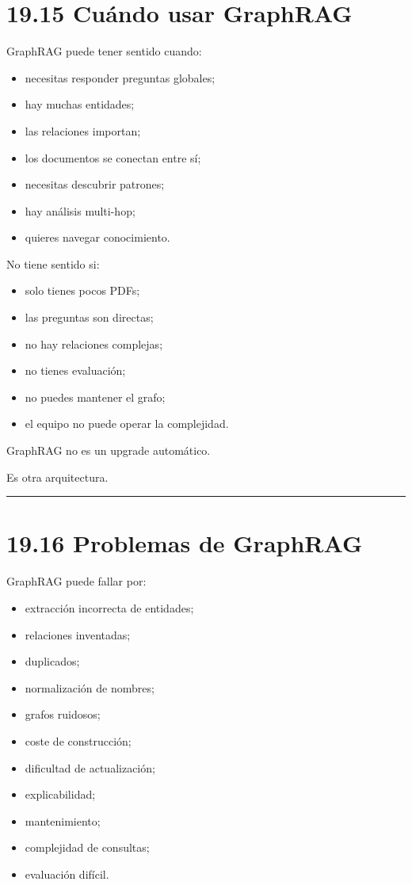 \section{19.15 Cuándo usar GraphRAG}\label{cuuxe1ndo-usar-graphrag}

GraphRAG puede tener sentido cuando:

\begin{itemize}
\tightlist
\item
  necesitas responder preguntas globales;
\item
  hay muchas entidades;
\item
  las relaciones importan;
\item
  los documentos se conectan entre sí;
\item
  necesitas descubrir patrones;
\item
  hay análisis multi-hop;
\item
  quieres navegar conocimiento.
\end{itemize}

No tiene sentido si:

\begin{itemize}
\tightlist
\item
  solo tienes pocos PDFs;
\item
  las preguntas son directas;
\item
  no hay relaciones complejas;
\item
  no tienes evaluación;
\item
  no puedes mantener el grafo;
\item
  el equipo no puede operar la complejidad.
\end{itemize}

GraphRAG no es un upgrade automático.

Es otra arquitectura.

\begin{center}\rule{0.5\linewidth}{0.5pt}\end{center}

\section{19.16 Problemas de GraphRAG}\label{problemas-de-graphrag}

GraphRAG puede fallar por:

\begin{itemize}
\tightlist
\item
  extracción incorrecta de entidades;
\item
  relaciones inventadas;
\item
  duplicados;
\item
  normalización de nombres;
\item
  grafos ruidosos;
\item
  coste de construcción;
\item
  dificultad de actualización;
\item
  explicabilidad;
\item
  mantenimiento;
\item
  complejidad de consultas;
\item
  evaluación difícil.
\end{itemize}

